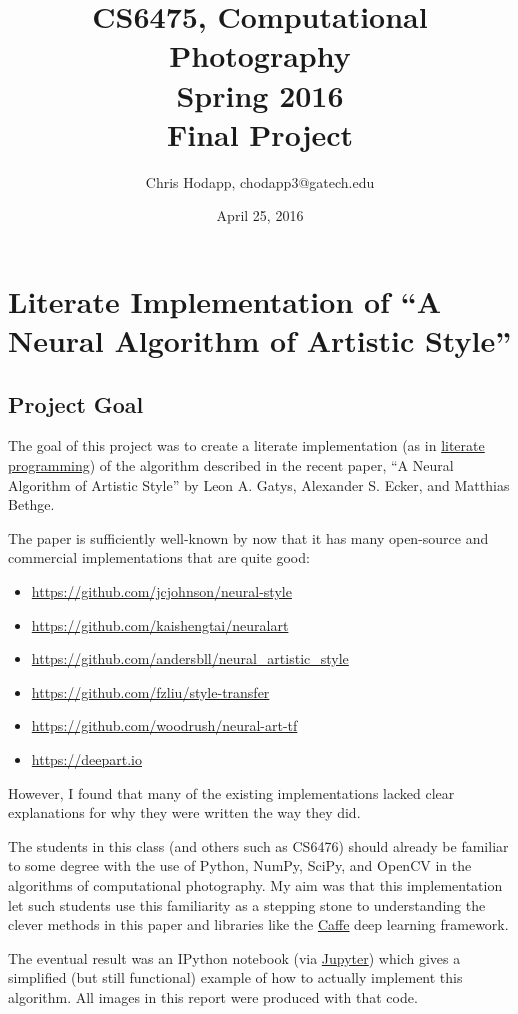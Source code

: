 \documentclass{article}
\title
    {CS6475, Computational Photography \\
      Spring 2016 \\
      Final Project}
\date{April 25, 2016}
\author{Chris Hodapp, chodapp3@gatech.edu}
\begin{document}
\section{Literate Implementation of ``A Neural Algorithm of Artistic Style''}

\subsection{Project Goal}

The goal of this project was to create a literate implementation (as
in \href{https://en.wikipedia.org/wiki/Literate_programming}{literate
  programming}) of the algorithm described in the recent paper, ``A
Neural Algorithm of Artistic Style'' by Leon A. Gatys, Alexander
S. Ecker, and Matthias Bethge\cite{neuralstyle2015}.

The paper is sufficiently well-known by now that it has many
open-source and commercial implementations that are quite good:

\begin{itemize}
  \item \url{https://github.com/jcjohnson/neural-style}
  \item \url{https://github.com/kaishengtai/neuralart}
  \item \url{https://github.com/andersbll/neural_artistic_style}
  \item \url{https://github.com/fzliu/style-transfer}
  \item \url{https://github.com/woodrush/neural-art-tf}
  \item \url{https://deepart.io}
\end{itemize}

However, I found that many of the existing implementations lacked
clear explanations for why they were written the way they did.

The students in this class (and others such as CS6476) should already
be familiar to some degree with the use of Python, NumPy, SciPy, and
OpenCV in the algorithms of computational photography.  My aim was
that this implementation let such students use this familiarity as a
stepping stone to understanding the clever methods in this paper and
libraries like the \href{http://caffe.berkeleyvision.org/}{Caffe} deep
learning framework.

The eventual result was an IPython notebook (via
\href{https://jupyter.org/}{Jupyter}) which gives a simplified (but
still functional) example of how to actually implement this algorithm.
All images in this report were produced with that code.
\end{document}
